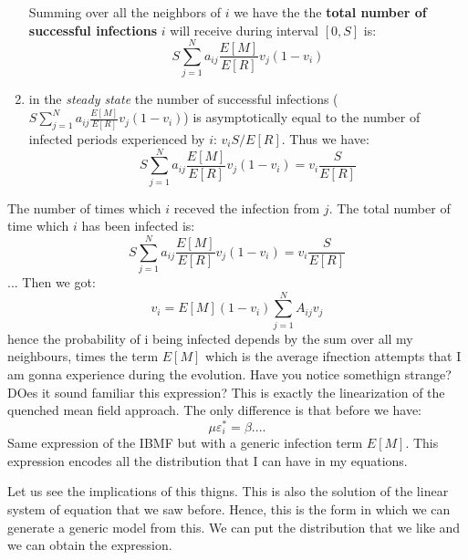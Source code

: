 \documentclass[../main/main.tex]{subfiles}
\begin{document}
\begin{enumerate}
Summing over all the neighbors of $i$ we have the the \textbf{total number of successful infections} \( i \) will receive during interval \( [0,S] \) is:
\begin{equation*}
  S \sum_{j=1}^{N}  a_{ij} \frac{E[M]}{E[R]} v_{j} (1-v_i)
\end{equation*}

\item in the \emph{steady state} the number of successful infections (\(  S \sum_{j=1}^{N}  a_{ij} \frac{E[M]}{E[R]} v_{j} (1-v_i) \)) is asymptotically equal to the number of infected periods experienced by \( i \): \( v_i S / E[R] \). Thus we have:
\begin{equation}
  S \sum_{j=1}^{N}  a_{ij} \frac{E[M]}{E[R]} v_{j} (1-v_i) = v_i \frac{S}{E[R]}
\end{equation}




\end{enumerate}




The  number of times which \( i \) receved the infection from \( j \). The total number of time which \( i \) has been infected is:
\begin{equation*}
  S \sum_{j=1}^{N}  a_{ij} \frac{E[M]}{E[R]} v_{j} (1-v_i) = v_i \frac{S}{E[R]}
\end{equation*}
...
Then we got:
\begin{equation*}
  v_i = E[M] (1- v_i) \sum_{j=1}^{N} A_{ij} v_j
\end{equation*}
hence the probability of i being infected depends by the sum over all my neighbours, times the term \( E[M] \) which is the average ifnection attempts that I am gonna experience during the evolution.
Have you notice somethign strange? DOes it sound familiar this expression? This is exactly the linearization of the quenched mean field approach. The only difference is that before we have:
\begin{equation*}
  \mu \varepsilon _i^* = \beta ....
\end{equation*}
Same expression of the IBMF but with a generic infection term \( E[M] \). This expression encodes all the distribution that I can have in my equations.

Let us see the implications of this thigns. This is also the solution of the linear system of equation that we saw before. Hence, this is the form in which we can generate a generic model from this. We can put the distribution that we like and we can obtain the expression.
\end{document}
